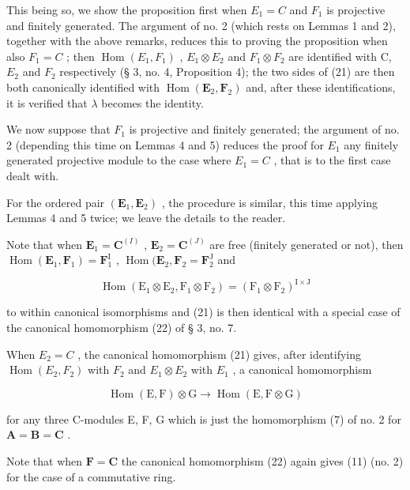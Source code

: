 This being so, we show the proposition first when \(E_{1} = C\) and \(F_{1}\) is projective and finitely generated. The argument of no. 2 (which rests on Lemmas 1 and 2), together with the above remarks, reduces this to proving the proposition when also \(F_{1} = C\) ; then \(\operatorname{Hom}(E_{1}, F_{1})\) , \(E_{1} \otimes E_{2}\) and \(F_{1} \otimes F_{2}\) are identified with C, \(E_{2}\) and \(F_{2}\) respectively (§ 3, no. 4, Proposition 4); the two sides of (21) are then both canonically identified with \(\operatorname{Hom}(\mathbf{E}_{2},\mathbf{F}_{2})\) and, after these identifications, it is verified that \(\lambda\) becomes the identity.

We now suppose that \(F_{1}\) is projective and finitely generated; the argument of no. 2 (depending this time on Lemmas 4 and 5) reduces the proof for \(E_{1}\) any finitely generated projective module to the case where \(E_{1} = C\) , that is to the first case dealt with.

For the ordered pair \((\mathbf{E}_{1}, \mathbf{E}_{2})\) , the procedure is similar, this time applying Lemmas 4 and 5 twice; we leave the details to the reader.

Note that when \(\mathbf{E}_1 = \mathbf{C}^{(I)}\) , \(\mathbf{E}_2 = \mathbf{C}^{(J)}\) are free (finitely generated or not), then \(\operatorname{Hom}(\mathbf{E}_1, \mathbf{F}_1) = \mathbf{F}_1^{\mathrm{I}}\) , \(\operatorname{Hom}(\mathbf{E}_2, \mathbf{F}_2 = \mathbf{F}_2^{\mathrm{J}}\) and

\[
\operatorname{Hom} \left(\mathrm{E} _ {1} \otimes \mathrm{E} _ {2}, \mathrm{F} _ {1} \otimes \mathrm{F} _ {2}\right) = \left(\mathrm{F} _ {1} \otimes \mathrm{F} _ {2}\right) ^ {\mathrm{I} \times \mathrm{J}}
\]

to within canonical isomorphisms and (21) is then identical with a special case of the canonical homomorphism (22) of § 3, no. 7.

When \(E_{2} = C\) , the canonical homomorphism (21) gives, after identifying \(\operatorname{Hom}(E_{2}, F_{2})\) with \(F_{2}\) and \(E_{1} \otimes E_{2}\) with \(E_{1}\) , a canonical homomorphism

\[
\operatorname{Hom} (\mathrm{E}, \mathrm{F}) \otimes \mathrm{G} \rightarrow \operatorname{Hom} (\mathrm{E}, \mathrm{F} \otimes \mathrm{G})\tag{22}
\]

for any three C-modules E, F, G which is just the homomorphism (7) of no. 2 for \(\mathbf{A} = \mathbf{B} = \mathbf{C}\) .

Note that when \(\mathbf{F} = \mathbf{C}\) the canonical homomorphism (22) again gives (11) (no. 2) for the case of a commutative ring.

